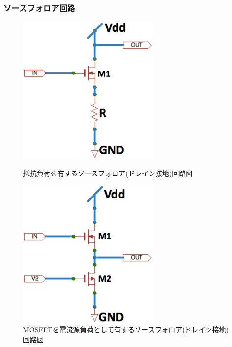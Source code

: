 		\subsubsection{ソースフォロア回路}
			\begin{figure}[htbp]
				 \begin{minipage}{0.5\hsize}
					\begin{center}
						\includegraphics[width=70mm]{./Chapter/Chapter3/Picture/MOSFET_SourceFollower_1.eps}
					\end{center}
					\caption{抵抗負荷を有するソースフォロア(ドレイン接地)回路図}
					\label{fig:MOSFET_SourceFollower_1}
				\end{minipage}
				\begin{minipage}{0.5\hsize}
					\begin{center}
						\includegraphics[width=70mm]{./Chapter/Chapter3/Picture/MOSFET_SourceFollower_2.eps}
					\end{center}
					\caption{MOSFETを電流源負荷として有するソースフォロア(ドレイン接地)回路図}
					\label{fig:MOSFET_SourceFollower_2}
				\end{minipage}
			\end{figure}	
